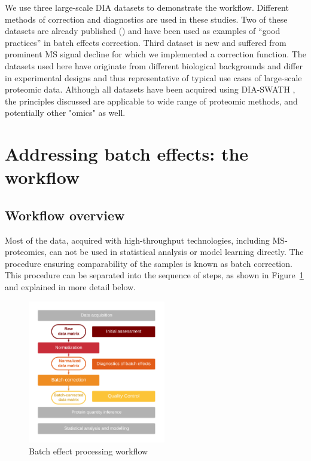 \documentclass[alpha-refs]{wiley-article}
\begin{document}
We use three large-scale DIA datasets to demonstrate the workflow. Different methods of correction and diagnostics are used in these studies. Two of these datasets are already published (\cite{Collins2017, Sajic2018}) and have been used as examples of “good practices” in batch effects correction. Third dataset is new and suffered from prominent MS signal decline for which we implemented a correction function. The datasets used here have originate from different biological backgrounds and differ in experimental designs and thus representative of typical use cases of large-scale proteomic data. Although all datasets have been acquired using DIA-SWATH \cite{Gillet:2012aa}, the principles discussed are applicable to wide range of proteomic methods, and potentially other "omics" as well.

\section{Addressing batch effects: the workflow}
\subsection{Workflow overview}
Most of the data, acquired with high-throughput technologies, including MS-proteomics, can not be used in statistical analysis or model learning directly. The procedure ensuring comparability of the samples is known as batch correction. This procedure can be separated into the sequence of steps, as shown in Figure~\ref{fig:batch_fig1_workflow} and explained in more detail below.  
\begin{figure}[bt]
	\center
	\includegraphics[width=6cm]{figures/Fig0_workflow_staircase}
	\caption[Batch effect correction workflow]
	{Batch effect processing workflow}
	\label{fig:batch_fig1_workflow}
\end{figure}
\end{document}
